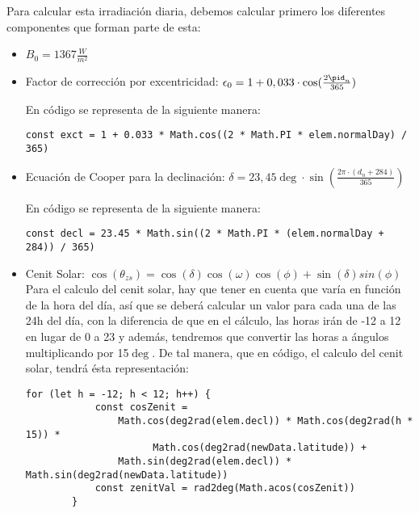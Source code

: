 Para calcular esta irradiación diaria, debemos calcular primero los diferentes componentes que forman parte de esta:
\begin{itemize}
\item $B_{0} = 1367 \frac{W}{m^2}$
\item Factor de corrección por excentricidad: $\epsilon_0 = 1 + 0,033 \cdot \cos(\frac{2\pid_n}{365})$

En código se representa de la siguiente manera:
\begin{lstlisting}[style=ES6, caption={Factor de corrección por excentricidad}]
		const exct = 1 + 0.033 * Math.cos((2 * Math.PI * elem.normalDay) / 365)
\end{lstlisting}
\item Ecuación de Cooper para la declinación: $\delta = 23,45\deg · \sin(\frac{2\pi·(d_n+284)}{365})$

En código se representa de la siguiente manera:
\begin{lstlisting}[style=ES6, caption={Ecuación de Cooper para declinación}]
		const decl = 23.45 * Math.sin((2 * Math.PI * (elem.normalDay + 284)) / 365)
\end{lstlisting}
\item Cenit Solar: $\cos(\theta_{zs}) = \cos(\delta)\cos(\omega)\cos(\phi) + \sin(\delta)sin(\phi)$\\

Para el calculo del cenit solar, hay que tener en cuenta que varía en función de la hora del día, así que se deberá calcular un valor para cada una de las 24h del día, con la diferencia de que en el cálculo, las horas irán de -12 a 12 en lugar de 0 a 23 y además, tendremos que convertir las horas a ángulos multiplicando por 15$\deg$. De tal manera, que en código, el calculo del cenit solar, tendrá ésta representación:\\
\begin{lstlisting}[style=ES6, caption={Cálculo del cenit solar}]
		for (let h = -12; h < 12; h++) {
			const cosZenit =
				Math.cos(deg2rad(elem.decl)) * Math.cos(deg2rad(h * 15)) * 	
					  Math.cos(deg2rad(newData.latitude)) +
				Math.sin(deg2rad(elem.decl)) * Math.sin(deg2rad(newData.latitude))
			const zenitVal = rad2deg(Math.acos(cosZenit))
		}
\end{lstlisting}
\end{itemize}

